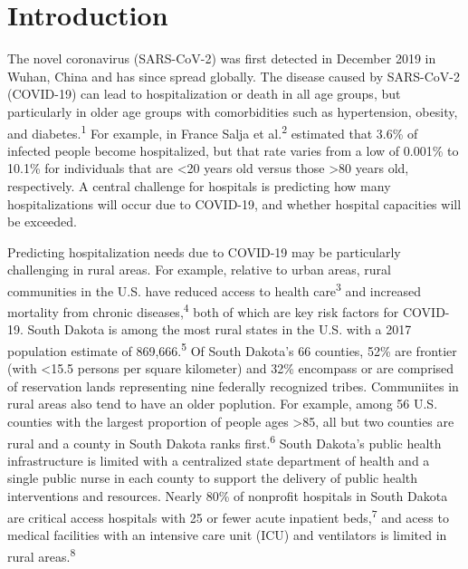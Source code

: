 \documentclass[
]{article}
\begin{document}
\hypertarget{introduction}{%
\section{Introduction}\label{introduction}}

The novel coronavirus (SARS-CoV-2) was first detected in December 2019 in Wuhan, China and has since spread globally. The disease caused by SARS-CoV-2 (COVID-19) can lead to hospitalization or death in all age groups, but particularly in older age groups with comorbidities such as hypertension, obesity, and diabetes.\textsuperscript{1} For example, in France Salja et al.\textsuperscript{2} estimated that 3.6\% of infected people become hospitalized, but that rate varies from a low of 0.001\% to 10.1\% for individuals that are \textless20 years old versus those \textgreater80 years old, respectively. A central challenge for hospitals is predicting how many hospitalizations will occur due to COVID-19, and whether hospital capacities will be exceeded.

Predicting hospitalization needs due to COVID-19 may be particularly challenging in rural areas. For example, relative to urban areas, rural communities in the U.S. have reduced access to health care\textsuperscript{3} and increased mortality from chronic diseases,\textsuperscript{4} both of which are key risk factors for COVID-19. South Dakota is among the most rural states in the U.S. with a 2017 population estimate of 869,666.\textsuperscript{5} Of South Dakota's 66 counties, 52\% are frontier (with \textless15.5 persons per square kilometer) and 32\% encompass or are comprised of reservation lands representing nine federally recognized tribes. Communiites in rural areas also tend to have an older poplution. For example, among 56 U.S. counties with the largest proportion of people ages \textgreater85, all but two counties are rural and a county in South Dakota ranks first.\textsuperscript{6} South Dakota's public health infrastructure is limited with a centralized state department of health and a single public nurse in each county to support the delivery of public health interventions and resources. Nearly 80\% of nonprofit hospitals in South Dakota are critical access hospitals with 25 or fewer acute inpatient beds,\textsuperscript{7} and acess to medical facilities with an intensive care unit (ICU) and ventilators is limited in rural areas.\textsuperscript{8}
\end{document}

